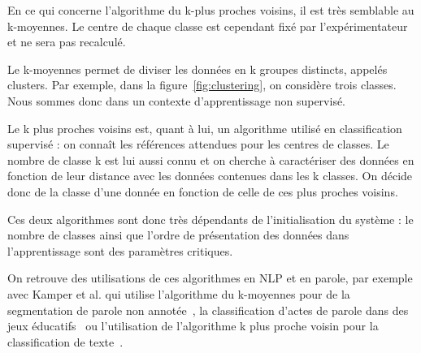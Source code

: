 
En ce qui concerne l'algorithme du k-plus proches voisins, il est très semblable au k-moyennes. Le centre de chaque classe est cependant fixé par l'expérimentateur et ne sera pas recalculé.



Le k-moyennes permet de diviser les données en k groupes distincts, appelés clusters. Par exemple, dans la figure~\ref{fig:clustering}, on considère trois classes. Nous sommes donc dans un contexte d'apprentissage non supervisé.

Le k plus proches voisins est, quant à lui, un algorithme utilisé en classification supervisé : on connaît les références attendues pour les centres de classes. Le nombre de classe k est lui aussi connu et on cherche à caractériser des données en fonction de leur distance avec les données contenues dans les k classes. On décide donc de la classe d'une donnée en fonction de celle de ces plus proches voisins.

Ces deux algorithmes sont donc très dépendants de l'initialisation du système : le nombre de classes ainsi que l'ordre de présentation des données dans l'apprentissage sont des paramètres critiques.%

On retrouve des utilisations de ces algorithmes en NLP et en parole, par exemple avec Kamper et al. qui utilise l'algorithme du k-moyennes pour de la segmentation de parole non annotée~\cite{Kamper2017}, la classification d'actes de parole dans des jeux éducatifs~\cite{Rus2012} ou l'utilisation de l'algorithme k plus proche voisin pour la classification de texte~\cite{Zhou2015}.


